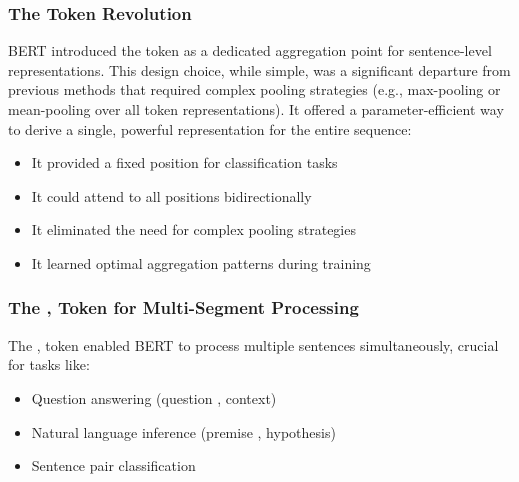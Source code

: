 \subsubsection{The \cls{} Token Revolution}
BERT introduced the \cls{} token as a dedicated aggregation point for sentence-level representations. This design choice, while simple, was a significant departure from previous methods that required complex pooling strategies (e.g., max-pooling or mean-pooling over all token representations). It offered a parameter-efficient way to derive a single, powerful representation for the entire sequence:
\begin{itemize}
\item It provided a fixed position for classification tasks
\item It could attend to all positions bidirectionally
\item It eliminated the need for complex pooling strategies
\item It learned optimal aggregation patterns during training
\end{itemize}

\subsubsection{The \sep{} Token for Multi-Segment Processing}
The \sep{} token enabled BERT to process multiple sentences simultaneously, crucial for tasks like:
\begin{itemize}
\item Question answering (question \sep{} context)
\item Natural language inference (premise \sep{} hypothesis)
\item Sentence pair classification
\end{itemize}

